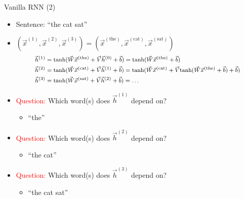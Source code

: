 \begin{vbframe}{Vanilla RNN (2)}

\vfill

\begin{itemize}
\item Sentence: ``the cat sat''
\item $(\vec x^{(1)}, \vec x^{(2)}, \vec x^{(3)}) = (\vec x^{(\text{the})}, \vec x^{(\text{cat})}, \vec x^{(\text{sat})})$
$$
\footnotesize
\begin{aligned}
\vec h^{(1)} & = \mathrm{tanh}(\vec W \vec x^{(\text{the})} + \vec V \vec h^{(0)} + \vec b) = \mathrm{tanh}(\vec W \vec x^{(\text{the})} + \vec b) \\
\vec h^{(2)} & = \mathrm{tanh}(\vec W \vec x^{(\text{cat})} + \vec V \vec h^{(1)}+ \vec b) = \mathrm{tanh}(\vec W \vec x^{(\text{cat})} + \vec V \mathrm{tanh}(\vec W \vec x^{(\text{the})} + \vec b) + \vec b) \\
\vec h^{(3)} & = \mathrm{tanh}(\vec W \vec x^{(\text{sat})} + \vec V \vec h^{(2)} + \vec b) = \ldots
\end{aligned}
$$
\item \textcolor{red}{Question:} Which word(s) does $\vec h^{(1)}$ depend on?
\begin{itemize}
\item ``the''
\end{itemize}
\item \textcolor{red}{Question:} Which word(s) does $\vec h^{(2)}$ depend on?
\begin{itemize}
\item ``the cat''
\end{itemize}
\item \textcolor{red}{Question:} Which word(s) does $\vec h^{(3)}$ depend on?
\begin{itemize}
\item ``the cat sat''
\end{itemize}
\end{itemize}

\vfill

\end{vbframe}


